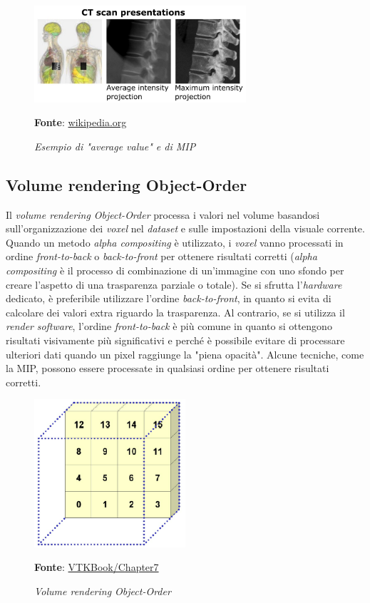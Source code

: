 \begin{figure}[h]
    \centering
    \includegraphics[width=0.7\textwidth]{immagini/volumerendering/mip.jpg}
    \caption{\textit{Esempio di "average value" e di MIP}}
    \textbf{Fonte}: \href{https://en.wikipedia.org/wiki/Maximum_intensity_projection}{wikipedia.org}
    \label{fig: Volume Rendering Example}
\end{figure}

\subsection{Volume rendering Object-Order}\label{sec:volume-object-order}
Il \emph{volume rendering Object-Order} processa i valori nel volume basandosi sull'organizzazione dei \emph{voxel} nel \emph{dataset} e sulle impostazioni della visuale corrente. Quando un metodo \emph{alpha compositing} è utilizzato, i \emph{voxel} vanno processati in ordine \emph{front-to-back} o \emph{back-to-front} per ottenere risultati corretti (\emph{alpha compositing} è il processo di combinazione di un'immagine con uno sfondo per creare l'aspetto di una trasparenza parziale o totale). Se si sfrutta l'\emph{hardware} dedicato, è preferibile utilizzare l'ordine \emph{back-to-front}, in quanto si evita di calcolare dei valori extra riguardo la trasparenza. Al contrario, se si utilizza il \emph{render} \emph{software}, l'ordine \emph{front-to-back} è più comune in quanto si ottengono risultati visivamente più significativi e perché è possibile evitare di processare ulteriori dati quando un pixel raggiunge la "piena opacità". Alcune tecniche, come la MIP, possono essere processate in qualsiasi ordine per ottenere risultati corretti.

\begin{figure}[h]
    \centering
    \includegraphics[width=0.5\textwidth]{immagini/volumerendering/objectorder.png}
    \caption{\textit{Volume rendering Object-Order}}
    \textbf{Fonte}: \href{https://lorensen.github.io/VTKExamples/site/VTKBook/07Chapter7/}{VTKBook/Chapter7}
    \label{fig: Volume Rendering Object-Order}
\end{figure}

